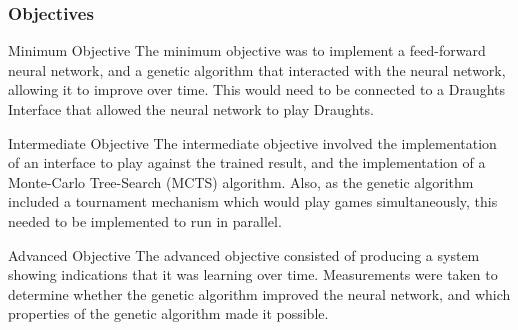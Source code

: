 \documentclass{beamer}
\begin{document}
  \begin{frame}
    \frametitle{Objectives}



    \begin{block}{Minimum Objective}
      The minimum objective was to implement a feed-forward neural network, and a genetic algorithm that interacted with the neural network, allowing it to improve over time. This would need to be connected to a Draughts Interface that allowed the neural network to play Draughts. 

      \end{block}

        
    \begin{block}{Intermediate Objective}
        The intermediate objective involved the implementation of an interface to play against the trained result, and the implementation of a Monte-Carlo Tree-Search (MCTS) algorithm. Also, as the genetic algorithm included a tournament mechanism which would play games simultaneously, this needed to be implemented to run in parallel.
        
      \end{block}

        
    \begin{block}{Advanced Objective}
        The advanced objective consisted of producing a system showing indications that it was learning over time. Measurements were taken to determine whether the genetic algorithm improved the neural network, and which properties of the genetic algorithm made it possible.
    
      \end{block}

        
  \end{frame}
\end{document}
